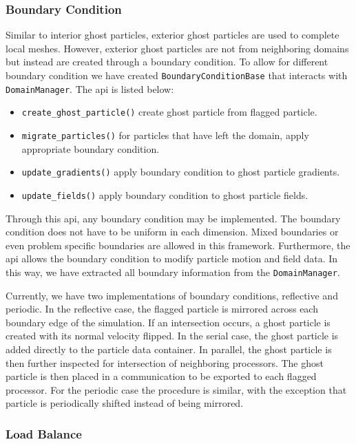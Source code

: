 \subsubsection{Boundary Condition}
Similar to interior ghost particles, exterior ghost particles are used to
complete local meshes. However, exterior ghost particles are not from neighboring
domains but instead are created through a boundary condition. To allow for different
boundary condition we have created \lstinline{BoundaryConditionBase} that interacts
with \lstinline{DomainManager}. The api is listed below:
\begin{itemize}
	\item \lstinline{create_ghost_particle()} create ghost particle from flagged particle.
    \item \lstinline{migrate_particles()} for particles that have left the domain, apply
    appropriate boundary condition.
    \item \lstinline{update_gradients()} apply boundary condition to ghost particle gradients.
    \item \lstinline{update_fields()} apply boundary condition to ghost particle fields.
\end{itemize}
Through this api, any boundary condition may be implemented. The boundary condition does not have
to be uniform in each dimension. Mixed boundaries or even problem specific boundaries are allowed
in this framework. Furthermore, the api allows the boundary
condition to modify particle motion and field data. In this way, we have extracted all boundary
information from the \lstinline{DomainManager}.

Currently, we have two implementations of boundary conditions, reflective and periodic.
In the reflective case, the flagged particle is mirrored across each boundary edge of the
simulation. If an intersection occurs, a ghost particle is created with its normal velocity flipped.
In the serial case, the ghost particle is added directly to the particle data container. In parallel, the 
ghost particle is then further inspected for intersection of neighboring processors. The ghost particle
is then placed in a communication to be exported to each flagged processor. For the periodic case
the procedure is similar, with the exception that particle is periodically shifted
instead of being mirrored.

\subsubsection{Load Balance}



